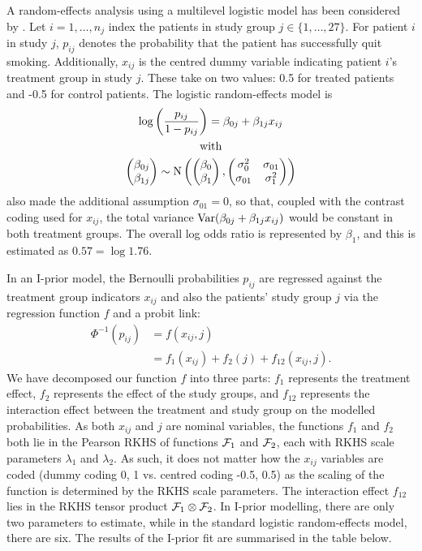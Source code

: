 \documentclass[a4paper,showframe,11pt]{report}\usepackage[]{graphicx}\usepackage[]{color}
\begin{document}
A random-effects analysis using a multilevel logistic model has been considered by \citet{agresti2000tutorial}.
Let $i=1,\dots,n_j$ index the patients in study group $j \in \{1,\dots,27\}$.
For patient $i$ in study $j$, $p_{ij}$ denotes the probability that the patient has successfully quit smoking.
Additionally, $x_{ij}$ is the centred dummy variable indicating patient $i$'s treatment group in study $j$.
These take on two values: 0.5 for treated patients and -0.5 for control patients.
The logistic random-effects model is
\begin{gather*}
  \log \left( \frac{p_{ij}}{1-p_{ij}} \right) = \beta_{0j} + \beta_{1j}x_{ij} \\
  \text{with} \\
  \begin{pmatrix} \beta_{0j} \\ \beta_{1j} \end{pmatrix}
  \sim \operatorname{N} \left(
  \begin{pmatrix} \beta_0 \\ \beta_1 \end{pmatrix},
  \begin{pmatrix} \sigma_0^2 & \sigma_{01} \\ \sigma_{01} & \sigma_1^2 \\ \end{pmatrix}
  \right)
\end{gather*}
\citet{agresti2000tutorial} also made the additional assumption $\sigma_{01} = 0$, so that, coupled with the contrast coding used for $x_{ij}$, the total variance $\operatorname{Var}(\beta_{0j} + \beta_{1j}x_{ij})$ would be constant in both treatment groups.
The overall log odds ratio is represented by $\beta_1$, and this is estimated as $0.57 = \log 1.76$.

In an I-prior model, the Bernoulli probabilities $p_{ij}$ are regressed against the treatment group indicators $x_{ij}$ and also the patients' study group $j$ via the regression function $f$ and a probit link:
\begin{align*}
  \Phi^{-1}(p_{ij})
  &= f(x_{ij}, j) \\
  &= f_1(x_{ij}) + f_2(j) + f_{12}(x_{ij}, j).
\end{align*}
We have decomposed our function $f$ into three parts: $f_1$ represents the treatment effect, $f_2$ represents the effect of the study groups, and $f_{12}$ represents the interaction effect between the treatment and study group on the modelled probabilities.
As both $x_{ij}$ and $j$ are nominal variables, the functions $f_1$ and $f_2$ both lie in the Pearson RKHS of functions ${\mathcal F}_1$ and ${\mathcal F}_2$, each with RKHS scale parameters $\lambda_1$ and $\lambda_2$.
As such, it does not matter how the $x_{ij}$ variables are coded (dummy coding 0, 1 vs. centred coding -0.5, 0.5) as the scaling of the function is determined by the RKHS scale parameters.
The interaction effect $f_{12}$ lies in the RKHS tensor product ${\mathcal F}_1 \otimes {\mathcal F}_2$.
In I-prior modelling, there are only two parameters to estimate, while in the standard logistic random-effects model, there are six.
The results of the I-prior fit are summarised in the table below.
\end{document}
